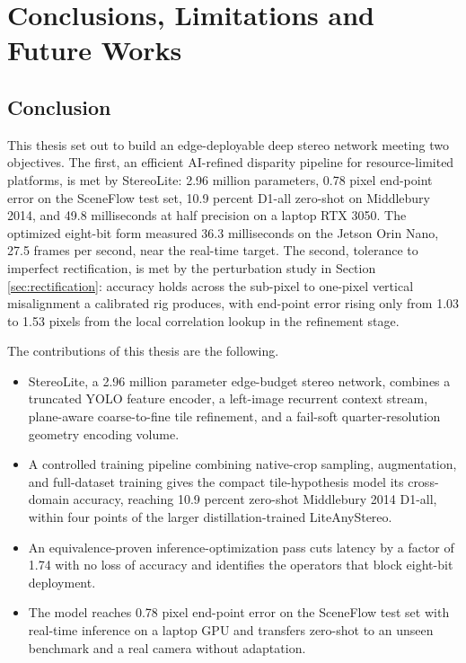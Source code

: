 \chapter{Conclusions, Limitations and Future Works}

\section{Conclusion}
This thesis set out to build an edge-deployable deep stereo network
meeting two objectives. The first, an efficient AI-refined disparity
pipeline for resource-limited platforms, is met by StereoLite: 2.96
million parameters, 0.78 pixel end-point error on the SceneFlow test set,
10.9 percent D1-all zero-shot on Middlebury 2014, and 49.8 milliseconds
at half precision on a laptop RTX 3050. The optimized eight-bit form
measured 36.3 milliseconds on the Jetson Orin Nano, 27.5 frames per
second, near the real-time target. The second, tolerance to imperfect
rectification, is met by the perturbation study in Section
\ref{sec:rectification}: accuracy holds across the sub-pixel to
one-pixel vertical misalignment a calibrated rig produces, with
end-point error rising only from 1.03 to 1.53 pixels from the local
correlation lookup in the refinement stage.

The contributions of this thesis are the following.
\begin{itemize}
\item StereoLite, a 2.96 million parameter edge-budget stereo network,
combines a truncated YOLO feature encoder, a left-image recurrent
context stream, plane-aware coarse-to-fine tile refinement, and a
fail-soft quarter-resolution geometry encoding volume.
\item A controlled training pipeline combining native-crop sampling,
augmentation, and full-dataset training gives the compact tile-hypothesis
model its cross-domain accuracy, reaching 10.9 percent zero-shot
Middlebury 2014 D1-all, within four points of the larger
distillation-trained LiteAnyStereo.
\item An equivalence-proven inference-optimization pass cuts latency by a
factor of 1.74 with no loss of accuracy and identifies the operators
that block eight-bit deployment.
\item The model reaches 0.78 pixel end-point error on the SceneFlow test
set with real-time inference on a laptop GPU and transfers zero-shot to
an unseen benchmark and a real camera without adaptation.
\end{itemize}

